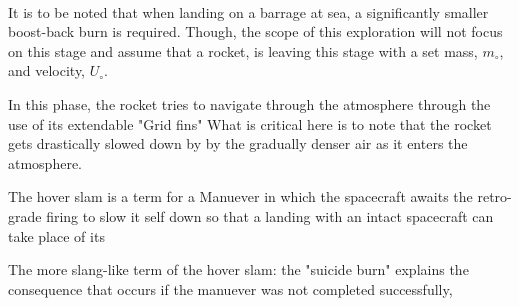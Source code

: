 \documentclass[12pt]{article}
\begin{document}
    \paragraph{\noindent}
    It is to be noted that when landing on a barrage at sea, a significantly smaller boost-back burn is required. Though, the scope of this exploration will not focus on this stage and assume that a rocket, is leaving this stage with a set mass, {$m_\circ$}, and velocity, {$U_\circ$}.

    

    In this phase, the rocket tries to navigate through the atmosphere through the use of its extendable "Grid fins" %
    What is critical here is to note that the rocket gets drastically slowed down by by the gradually denser air as it enters the atmosphere.
    



    The hover slam is a term for a Manuever in which the spacecraft awaits the retro-grade firing to slow it self down so that a landing with an intact spacecraft can take place of its 

    The more slang-like term of the hover slam: the "suicide burn" explains the consequence that occurs if the manuever was not completed successfully,
    

    
\end{document}
